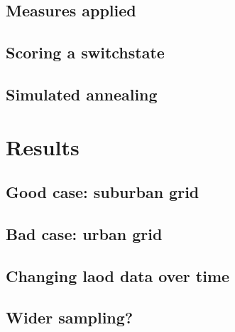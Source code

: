 \documentclass[a4paper]{report}
\begin{document}




\section{Measures applied}




\section{Scoring a switchstate}



\section{Simulated annealing}




\chapter{Results}


\section{Good case: suburban grid}

\section{Bad case: urban grid}

\section{Changing laod data over time}

\section{Wider sampling?}

\printbibliography
\end{document}
